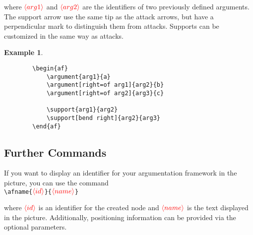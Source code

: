 \documentclass{article}
\newcommand{\opt}[2][red]{\ensuremath{\textcolor{#1}{\langle #2\rangle}}}
\newtheorem{example}{Example}
\begin{document}
    \begin{list}{}{\leftmargin=\parindent\rightmargin=0pt}
    \item where \opt{arg1} and \opt{arg2} are the identifiers of two previously defined arguments.
    The support arrow use the same tip as the attack arrows, but have a perpendicular mark to distinguish them from attacks.
    Supports can be customized in the same way as attacks.
    \end{list}
    \begin{example}~
    \begin{verbatim}
        \begin{af}
            \argument{arg1}{a}
            \argument[right=of arg1]{arg2}{b}
            \argument[right=of arg2]{arg3}{c}
    
            \support{arg1}{arg2}
            \support[bend right]{arg2}{arg3}
        \end{af}    
    \end{verbatim}

    \begin{center}
        \begin{af}
    
        \end{af}    
    \end{center}
    \end{example}


\subsection{Further Commands}
    If you want to display an identifier for your argumentation framework in the picture, you can use the command\\

    \noindent
    \verb|\afname{|\opt{id}\verb|}{|\opt{name}\verb|}|

    \begin{list}{}{\leftmargin=\parindent\rightmargin=0pt}
    \item where \opt{id} is an identifier for the created node and \opt{name} is the text displayed in the picture.
    Additionally, positioning information can be provided via the optional parameters.
    \end{list}
\end{document}
